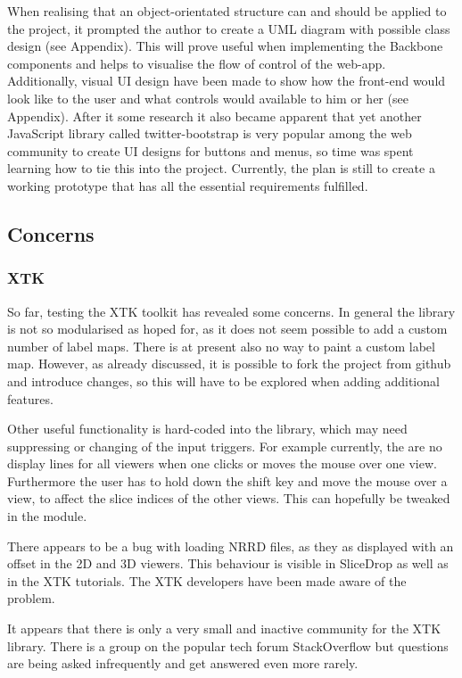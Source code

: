 \documentclass[a4paper,11pt,titlepage]{article}
\begin{document}
When realising that an object-orientated structure can and should be applied to the project, it prompted the author to create a UML diagram with possible class design (see Appendix). This will prove useful when implementing the Backbone components and helps to visualise the flow of control of the web-app. Additionally, visual UI design have been made to show how the front-end would look like to the user and what controls would available to him or her (see Appendix). After it some research it also became apparent that yet another JavaScript library called twitter-bootstrap is very popular among the web community to create UI designs for buttons and menus, so time was spent learning how to tie this into the project.
Currently, the plan is still to create a working prototype that has all the essential requirements fulfilled.


\subsection{Concerns}

\subsubsection{XTK}

So far, testing the XTK toolkit has revealed some concerns. In general the library is not so modularised as hoped for, as it does not seem possible to add a custom number of label maps. There is at present also no way to paint a custom label map. However, as already discussed, it is possible to fork the project from github and introduce changes, so this will have to be explored when adding additional features.

Other useful functionality is hard-coded into the library, which may need suppressing or changing of the input triggers. For example currently, the are no display lines for all viewers when one clicks or moves the mouse over one view. Furthermore the user has to hold down the shift key and move the mouse over a view, to affect the slice indices of the other views. This can hopefully be tweaked in the module.

There appears to be a bug with loading NRRD files, as they as displayed with an offset in the 2D and 3D viewers. This behaviour is visible in SliceDrop as well as in the XTK tutorials. The XTK developers have been made aware of the problem.

It appears that there is only a very small and inactive community for the XTK library. There is a group on the popular tech forum StackOverflow but questions are being asked infrequently and get answered even more rarely. 
\end{document}
